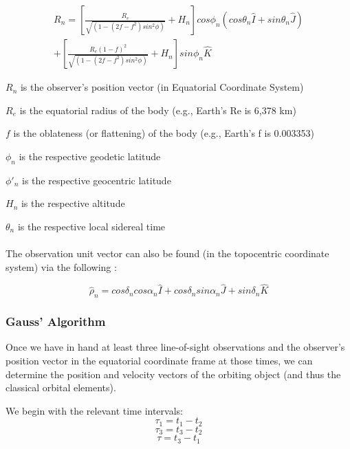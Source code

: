 \documentclass[11pt,twoside,letterpaper]{article}
\begin{document}
  \begin{equation} \label{obsPos}
    \begin{split}
      R_n =
      \left[
        \frac{R_e}{\sqrt{(1 - (2f -f^2)sin^2\phi)}} + H_n
        \right]cos\phi_n(cos\theta_n\hat{I} + sin\theta_n\hat{J}) \\+
      \left[
        \frac{R_e(1 - f)^2}{\sqrt{(1 - (2f -f^2)sin^2\phi)}} + H_n
        \right]sin\phi_n\hat{K}
    \end{split}
  \end{equation}

  \(R_n\) is the observer's position vector (in Equatorial Coordinate System)
  
  \(R_e\) is the equatorial radius of the body (e.g., Earth's Re is 6,378 km)
  
  \(f\) is the oblateness (or flattening) of the body (e.g., Earth's f is 0.003353)
  
  \(\phi_n\) is the respective geodetic latitude
  
  \(\phi'_n\) is the respective geocentric latitude
  
  \(H_n\) is the respective altitude
  
  \(\theta_n\) is the respective local sidereal time

  \paragraph{}
  
  The observation unit vector can also be found (in the topocentric
  coordinate system) via the following  \cite{Wikipedia_2018}:

  \begin{equation}\label{losVec}
    \hat{\rho}_n = cos\delta_ncos\alpha_n\hat{I}
    + cos\delta_nsin\alpha_n\hat{J} + sin\delta_n\hat{K}
  \end{equation}

  \subsubsection{Gauss' Algorithm}
  Once we have in hand at least three line-of-sight observations and
  the observer's position vector in the equatorial coordinate frame at
  those times, we can determine the position and velocity vectors of
  the orbiting object (and thus the classical orbital elements).

  We begin with the relevant time intervals:
  \begin{equation}
    \tau_1 = t_1 - t_2
  \end{equation}
  \begin{equation}
    \tau_3 = t_3 - t_2
  \end{equation}
  \begin{equation}
    \tau = t_3 - t_1
  \end{equation}
\end{document}
